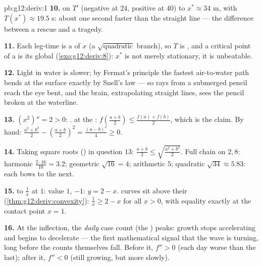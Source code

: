 \begin{solution}{pb:g12:deriv:1}
\textbf{10.}  on $T'$ (negative at $24$, positive at
$40$)  to $x^* \approx 34$ m, with
$T(x^*) \approx 19.5$ s: about one second faster than the
straight line --- the difference between a rescue and a
tragedy.

\textbf{11.} Each leg-time is a   of $x$
(a $\sqrt{\text{quadratic}}$ branch), so $T$ is , and a
critical point of a    is its
global  (\cref{exo:g12:deriv:8}): $x^*$ is not merely
stationary, it is unbeatable.

\textbf{12.} Light in water is slower; by Fermat's principle
the fastest air-to-water path bends at the surface exactly by
Snell's law --- so rays from a submerged pencil reach the eye
bent, and the brain, extrapolating straight lines, sees the
pencil broken at the waterline.

\textbf{13.} $(x^2)'' = 2 > 0$: .  at the
: $f\left(\frac{a+b}{2}\right) \leq
\frac{f(a) + f(b)}{2}$, which is the claim. By hand:
$\frac{a^2 + b^2}{2} - \left(\frac{a+b}{2}\right)^2 =
\frac{(a - b)^2}{4} \geq 0$.

\textbf{14.} Taking square roots () in question 13:
$\frac{a + b}{2} \leq \sqrt{\frac{a^2 + b^2}{2}}$. Full chain
on $2, 8$: harmonic $\frac{2 \cdot 16}{10} = 3.2$; geometric
$\sqrt{16} = 4$; arithmetic $5$; quadratic
$\sqrt{34} \approx 5.83$: each  bows to the next.

\textbf{15.}  to $\frac1x$ at $1$: value $1$, 
$-1$: $y = 2 - x$.  curves sit above their 
(\cref{thm:g12:deriv:convexity}): $\frac1x \geq 2 - x$ for all
$x > 0$, with equality exactly at the contact point $x = 1$.

\textbf{16.} At the inflection, the \emph{daily} case count
(the ) peaks: growth stops accelerating and begins
to decelerate --- the first mathematical signal that the wave
is turning, long before the counts themselves fall. Before it,
$f'' > 0$ (each day worse than the last); after it,
$f'' < 0$ (still growing, but more slowly).


\end{solution}
